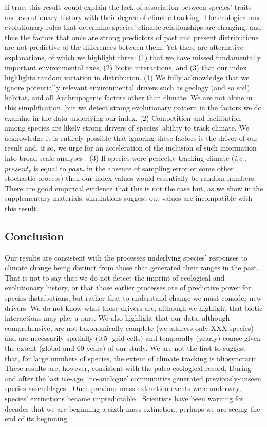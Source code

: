 \documentclass[12pt]{report}
\begin{document}
If true, this result would explain the lack of association between
species' traits and evolutionary history with their degree of climate
tracking. The ecological and evolutionary rules that determine
species' climate relationships are changing, and thus the factors that
once are strong predictors of past and present distributions are not
predictive of the differences between them. Yet there are alternative
explanations, of which we highlight three: (1) that we have missed
fundamentally important environmental axes, (2) biotic interactions,
and (3) that our index highlights random variation in
distribution. (1) We fully acknowledge that we ignore potentially
relevant environmental drivers such as geology (and so soil), habitat,
and all Anthropogenic factors other than climate. We are not alone in
this simplification\supercite{xxx}, but we detect strong evolutionary
pattern in the factors we do examine in the data underlying our
index. (2) Competition and facilitation among species are likely
strong drivers of species' ability to track climate\supercite{xxx}. We
acknowledge it is entirely possible that ignoring these factors is the
driver of our result and, if so, we urge for an acceleration of the
inclusion of such information into broad-scale analyses
\supercite{xxx}. (3) If species were perfectly tracking climate
(\emph{i.e.}, $present_\tau$ is equal to $past_\tau$ in the absence of
sampling error or some other stochastic process) then our index values
would essentially be random numbers. There are good empirical evidence
that this is not the case \supercite{xxx} but, as we show in the
supplementary materials, simulations suggest out values are
incompatible with this result.

\subsection*{Conclusion}
Our results are consistent with the processes underlying species'
responses to climate change being distinct from those that generated
their ranges in the past. That is not to say that we do not detect the
imprint of ecological and evolutionary history, or that those earlier
processes are of predictive power for species distributions, but
rather that to understand change we must consider new drivers. We do
not know what those drivers are, although we highlight that biotic
interactions may play a part. We also highlight that our data,
although comprehensive, are not taxonomically complete (we address
only XXX species) and are necessarily spatially ($0.5^\circ$ grid
cells) and temporally (yearly) coarse given the extent (global and 60
years) of our study. We are not the first to suggest that, for large
numbers of species, the extent of climate tracking is idiosyncratic
\supercite{xxx}. These results are, however, consistent with the
paleo-ecological record. During and after the last ice-age,
`no-analogue' communities generated previously-unseen species
assemblages \supercite{xxx}. Once previous mass extinction events were
underway, species' extinctions became unpredictable
\supercite{xxx}. Scientists have been warning for decades that we are
beginning a sixth mass extinction;
perhaps we are seeing the end of its beginning.
\end{document}
